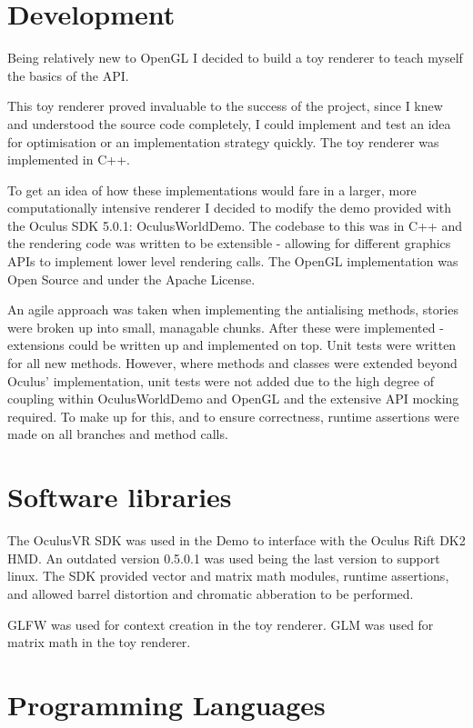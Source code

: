 \documentclass[12pt,a4paper,twoside,openright]{report}
\begin{document}
\section{Development}

Being relatively new to OpenGL I decided to build a toy renderer to teach myself the basics of the API.

This toy renderer proved invaluable to the success of the project, since I knew and understood the source code completely, I could implement and test an idea for optimisation or an implementation strategy quickly. The toy renderer was implemented in C++.

To get an idea of how these implementations would fare in a larger, more computationally intensive renderer I decided to modify the demo provided with the Oculus SDK 5.0.1: OculusWorldDemo.
The codebase to this was in C++ and the rendering code was written to be extensible - allowing for different graphics APIs to implement lower level rendering calls. The OpenGL implementation was Open Source and under the Apache License.

An agile approach was taken when implementing the antialising methods, stories were broken up into small, managable chunks. After these were implemented - extensions could be written up and implemented on top.
Unit tests were written for all new methods. However, where methods and classes were extended beyond Oculus' implementation, unit tests were not added due to the high degree of coupling within OculusWorldDemo and OpenGL and the extensive API mocking required. To make up for this, and to ensure correctness, runtime assertions were made on all branches and method calls.

\section{Software libraries}

The OculusVR SDK was used in the Demo to interface with the Oculus Rift DK2 HMD. An outdated version 0.5.0.1 was used being the last version to support linux.
The SDK provided vector and matrix math modules, runtime assertions, and allowed barrel distortion and chromatic abberation to be performed.

GLFW was used for context creation in the toy renderer.
GLM was used for matrix math in the toy renderer.

\section{Programming Languages}
\end{document}
